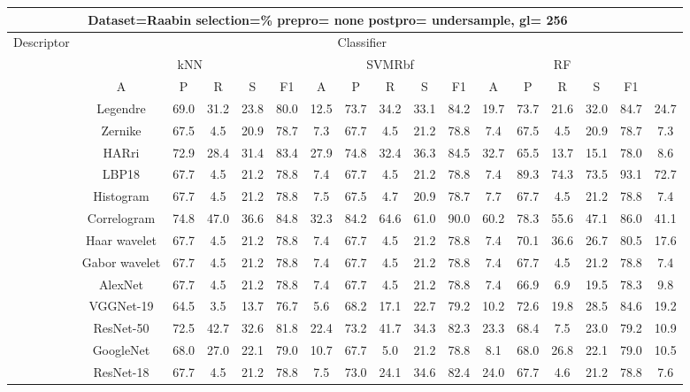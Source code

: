 \documentclass[12pt,italian]{article}
\begin{document}
\begin{tiny}
\begin{longtable}{lcccccccccccccccc}
\toprule
\multicolumn{16}{c}{Dataset=Raabin selection=\% prepro= none postpro= undersample, gl= 256} \\ 
\toprule
Descriptor & \multicolumn{15}{c}{Classifier} \\ 
& \multicolumn{5}{c}{kNN} & \multicolumn{5}{c}{SVMRbf} & \multicolumn{5}{c}{RF} \\ 
& A & P & R & S & F1 & A & P & R & S & F1 & A & P & R & S & F1 \\ 
\midrule
& Legendre & 69.0 & 31.2 & 23.8 & 80.0 & 12.5 & 73.7 & 34.2 & 33.1 & 84.2 & 19.7 & 73.7 & 21.6 & 32.0 & 84.7 & 24.7 \\ 
& Zernike & 67.5 &  4.5 & 20.9 & 78.7 &  7.3 & 67.7 &  4.5 & 21.2 & 78.8 &  7.4 & 67.5 &  4.5 & 20.9 & 78.7 &  7.3 \\ 
& HARri & 72.9 & 28.4 & 31.4 & 83.4 & 27.9 & 74.8 & 32.4 & 36.3 & 84.5 & 32.7 & 65.5 & 13.7 & 15.1 & 78.0 &  8.6 \\ 
& LBP18 & 67.7 &  4.5 & 21.2 & 78.8 &  7.4 & 67.7 &  4.5 & 21.2 & 78.8 &  7.4 & 89.3 & 74.3 & 73.5 & 93.1 & 72.7 \\ 
& Histogram & 67.7 &  4.5 & 21.2 & 78.8 &  7.5 & 67.5 &  4.7 & 20.9 & 78.7 &  7.7 & 67.7 &  4.5 & 21.2 & 78.8 &  7.4 \\ 
& Correlogram & 74.8 & 47.0 & 36.6 & 84.8 & 32.3 & 84.2 & 64.6 & 61.0 & 90.0 & 60.2 & 78.3 & 55.6 & 47.1 & 86.0 & 41.1 \\ 
& Haar wavelet & 67.7 &  4.5 & 21.2 & 78.8 &  7.4 & 67.7 &  4.5 & 21.2 & 78.8 &  7.4 & 70.1 & 36.6 & 26.7 & 80.5 & 17.6 \\ 
& Gabor wavelet & 67.7 &  4.5 & 21.2 & 78.8 &  7.4 & 67.7 &  4.5 & 21.2 & 78.8 &  7.4 & 67.7 &  4.5 & 21.2 & 78.8 &  7.4 \\ 
& AlexNet & 67.7 &  4.5 & 21.2 & 78.8 &  7.4 & 67.7 &  4.5 & 21.2 & 78.8 &  7.4 & 66.9 &  6.9 & 19.5 & 78.3 &  9.8 \\ 
& VGGNet-19 & 64.5 &  3.5 & 13.7 & 76.7 &  5.6 & 68.2 & 17.1 & 22.7 & 79.2 & 10.2 & 72.6 & 19.8 & 28.5 & 84.6 & 19.2 \\ 
& ResNet-50 & 72.5 & 42.7 & 32.6 & 81.8 & 22.4 & 73.2 & 41.7 & 34.3 & 82.3 & 23.3 & 68.4 &  7.5 & 23.0 & 79.2 & 10.9 \\ 
& GoogleNet & 68.0 & 27.0 & 22.1 & 79.0 & 10.7 & 67.7 &  5.0 & 21.2 & 78.8 &  8.1 & 68.0 & 26.8 & 22.1 & 79.0 & 10.5 \\ 
& ResNet-18 & 67.7 &  4.5 & 21.2 & 78.8 &  7.5 & 73.0 & 24.1 & 34.6 & 82.4 & 24.0 & 67.7 &  4.6 & 21.2 & 78.8 &  7.6 \\ 

\end{longtable}
\end{tiny}
\end{document}

